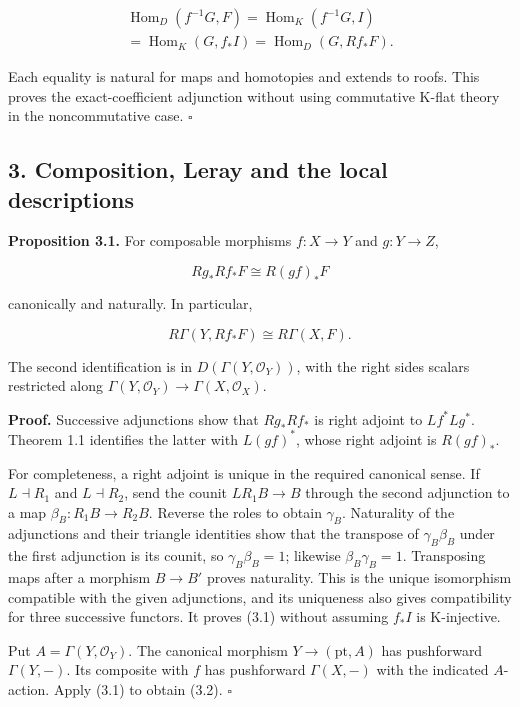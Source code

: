 \documentclass[
  english,
  11pt,
  a4paper,
]{article}
\begin{document}
\[\begin{gathered}
\operatorname{Hom}_D(f^{-1}G,F)
=\operatorname{Hom}_K(f^{-1}G,I)\\
=\operatorname{Hom}_K(G,f_*I)
=\operatorname{Hom}_D(G,Rf_*F).
\end{gathered}\]

Each equality is natural for maps and homotopies and extends to roofs.
This proves the exact-coefficient adjunction without using commutative
K-flat theory in the noncommutative case. \(\square\)

\subsection{3. Composition, Leray and the local
descriptions}\label{derived-pullback-and-pushforward--3-composition-leray-and-the-local-descriptions}

\textbf{Proposition 3.1.} For composable morphisms \(f:X\to Y\) and
\(g:Y\to Z\),

\[Rg_*Rf_*F\cong R(gf)_*F
\tag{3.1}\]

canonically and naturally. In particular,

\[R\Gamma(Y,Rf_*F)\cong R\Gamma(X,F).
\tag{3.2}\]

The second identification is in \(D(\Gamma(Y,\mathcal O_Y))\), with the
right side\textquotesingle s scalars restricted along
\(\Gamma(Y,\mathcal O_Y)\to\Gamma(X,\mathcal O_X)\).

\textbf{Proof.} Successive adjunctions show that \(Rg_*Rf_*\) is right
adjoint to \(Lf^*Lg^*\). Theorem 1.1 identifies the latter with
\(L(gf)^*\), whose right adjoint is \(R(gf)_*\).

For completeness, a right adjoint is unique in the required canonical
sense. If \(L\dashv R_1\) and \(L\dashv R_2\), send the counit
\(LR_1B\to B\) through the second adjunction to a map
\(\beta_B:R_1B\to R_2B\). Reverse the roles to obtain \(\gamma_B\).
Naturality of the adjunctions and their triangle identities show that
the transpose of \(\gamma_B\beta_B\) under the first adjunction is its
counit, so \(\gamma_B\beta_B=1\); likewise \(\beta_B\gamma_B=1\).
Transposing maps after a morphism \(B\to B'\) proves naturality. This is
the unique isomorphism compatible with the given adjunctions, and its
uniqueness also gives compatibility for three successive functors. It
proves (3.1) without assuming \(f_*I\) is K-injective.

Put \(A=\Gamma(Y,\mathcal O_Y)\). The canonical morphism
\(Y\to(\mathrm{pt},A)\) has pushforward \(\Gamma(Y,-)\). Its composite
with \(f\) has pushforward \(\Gamma(X,-)\) with the indicated
\(A\)-action. Apply (3.1) to obtain (3.2). \(\square\)
\end{document}
